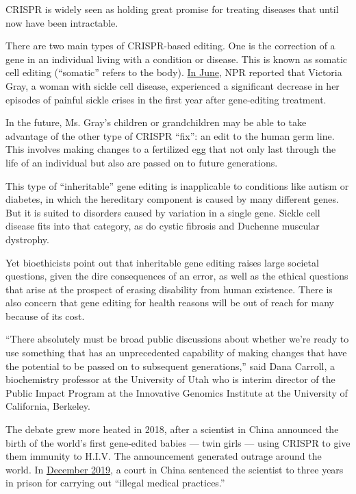 CRISPR is widely seen as holding great promise for treating diseases
that until now have been intractable.

There are two main types of CRISPR-based editing. One is the correction
of a gene in an individual living with a condition or disease. This is
known as somatic cell editing (``somatic'' refers to the body).
\href{https://www.npr.org/sections/health-shots/2020/06/23/877543610/a-year-in-1st-patient-to-get-gene-editing-for-sickle-cell-disease-is-thriving}{In
June}, NPR reported that Victoria Gray, a woman with sickle cell
disease, experienced a significant decrease in her episodes of painful
sickle crises in the first year after gene-editing treatment.

In the future, Ms. Gray's children or grandchildren may be able to take
advantage of the other type of CRISPR ``fix'': an edit to the human germ
line. This involves making changes to a fertilized egg that not only
last through the life of an individual but also are passed on to future
generations.

This type of ``inheritable'' gene editing is inapplicable to conditions
like autism or diabetes, in which the hereditary component is caused by
many different genes. But it is suited to disorders caused by variation
in a single gene. Sickle cell disease fits into that category, as do
cystic fibrosis and Duchenne muscular dystrophy.

Yet bioethicists point out that inheritable gene editing raises large
societal questions, given the dire consequences of an error, as well as
the ethical questions that arise at the prospect of erasing disability
from human existence. There is also concern that gene editing for health
reasons will be out of reach for many because of its cost.

``There absolutely must be broad public discussions about whether we're
ready to use something that has an unprecedented capability of making
changes that have the potential to be passed on to subsequent
generations,'' said Dana Carroll, a biochemistry professor at the
University of Utah who is interim director of the Public Impact Program
at the Innovative Genomics Institute at the University of California,
Berkeley.

The debate grew more heated in 2018, after a scientist in China
announced the birth of the world's first gene-edited babies --- twin
girls --- using CRISPR to give them immunity to H.I.V. The announcement
generated outrage around the world. In
\href{https://www.nytimes3xbfgragh.onion/2019/12/30/business/china-scientist-genetic-baby-prison.html}{December
2019}, a court in China sentenced the scientist to three years in prison
for carrying out ``illegal medical practices.''

